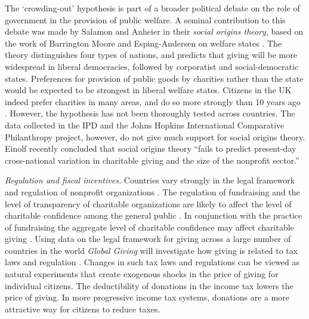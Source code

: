 \documentclass[twocolumn, serif, rga, numeric]{jote-article}
\begin{document}
The `crowding-out' hypothesis is part of a broader political debate on the role of government in the provision of public welfare. A seminal contribution to this debate was made by Salamon and Anheier in their \emph{social origins theory}\cite{Salamon1998}, based on the work of Barrington Moore \cite{Moore1966} and Esping-Andersen on welfare states \cite{Esping-Andersen1990}. The theory distinguishes four types of nations, and predicts that giving will be more widespread in liberal democracies, followed by corporatist and social-democratic states. Preferences for provision of public goods by charities rather than the state would be expected to be strongest in liberal welfare states. Citizens in the UK indeed prefer charities in many areas, and do so more strongly than 10 years ago \cite{Mohan2016}. However, the hypothesis has not been thoroughly tested across countries. The data collected in the IPD and the Johns Hopkins International Comparative Philanthropy project, however, do not give much support for social origins theory. Einolf recently concluded that social origins theory ``fails to predict present-day cross-national variation in charitable giving and the size of the nonprofit sector.''\cite{Einolf2015}

\emph{Regulation and fiscal incentives.} Countries vary strongly in the legal framework and regulation of nonprofit organizations \cite{Dehne2008, Moore1966, Einolf2015, Dehne2008, Layton2015, Quick2014}. The regulation of fundraising and the level of transparency of charitable organizations are likely to affect the level of charitable confidence among the general public \cite{Bekkers2003}. In conjunction with the practice of fundraising the aggregate level of charitable confidence may affect charitable giving \cite{Breeze2015}. Using data on the legal framework for giving across a large number of countries in the world \emph{Global Giving} will investigate how giving is related to tax laws and regulation \cite{Quick2014}. Changes in such tax laws and regulations can be viewed as natural experiments \cite{Hertwig2001, Carlsson2013} that create exogenous shocks in the price of giving for individual citizens. The deductibility of donations in the income tax lowers the price of giving. In more progressive income tax systems, donations are a more attractive way for citizens to reduce taxes.
\end{document}
